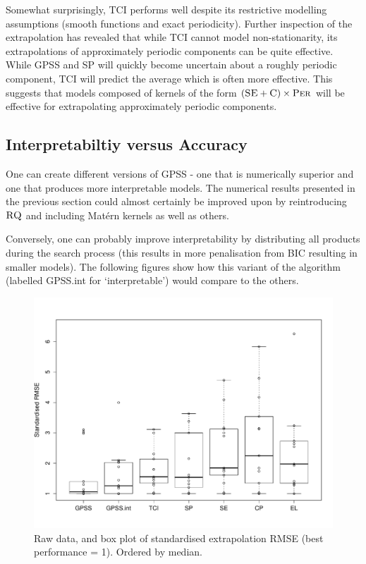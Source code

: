 \documentclass{article}
\begin{document}
Somewhat surprisingly, TCI performs well despite its restrictive modelling assumptions (smooth functions and exact periodicity).
Further inspection of the extrapolation has revealed that while TCI cannot model non-stationarity, its extrapolations of approximately periodic components can be quite effective.
While GPSS and SP will quickly become uncertain about a roughly periodic component, TCI will predict the average which is often more effective.
This suggests that models composed of kernels of the form $({\textsc{SE}} + {\textsc{C}}) \times {\textsc{Per}}$ will be effective for extrapolating approximately periodic components.


\subsection{Interpretabiltiy versus Accuracy}

One can create different versions of GPSS - one that is numerically superior and one that produces more interpretable models.
The numerical results presented in the previous section could almost certainly be improved upon by reintroducing ${\textsc{RQ}}$ and including Mat\'ern kernels as well as others.

Conversely, one can probably improve interpretability by distributing all products during the search process (this results in more penalisation from BIC resulting in smaller models).
The following figures show how this variant of the algorithm (labelled GPSS.int for `interpretable') would compare to the others.



\begin{figure}[h]
\centering
\includegraphics[width=\columnwidth]{figures/box_extrap_dist}
\caption{
Raw data, and box plot of standardised extrapolation RMSE (best performance = 1).
Ordered by median.
}
\label{fig:box_extrap_dist}
\end{figure}
\end{document}
